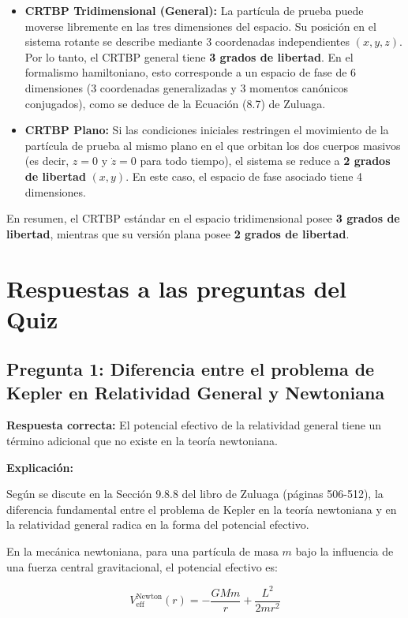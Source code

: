 \documentclass[a4paper]{article}
\begin{document}
\begin{itemize}
    \item \textbf{CRTBP Tridimensional (General):} La partícula de prueba puede moverse libremente en las tres dimensiones del espacio. Su posición en el sistema rotante se describe mediante 3 coordenadas independientes $(x, y, z)$. Por lo tanto, el CRTBP general tiene \textbf{3 grados de libertad}. En el formalismo hamiltoniano, esto corresponde a un espacio de fase de 6 dimensiones (3 coordenadas generalizadas y 3 momentos canónicos conjugados), como se deduce de la Ecuación (8.7) de Zuluaga.
    
    \item \textbf{CRTBP Plano:} Si las condiciones iniciales restringen el movimiento de la partícula de prueba al mismo plano en el que orbitan los dos cuerpos masivos (es decir, $z = 0$ y $\dot{z} = 0$ para todo tiempo), el sistema se reduce a \textbf{2 grados de libertad} $(x, y)$. En este caso, el espacio de fase asociado tiene 4 dimensiones.
\end{itemize}

En resumen, el CRTBP estándar en el espacio tridimensional posee \textbf{3 grados de libertad}, mientras que su versión plana posee \textbf{2 grados de libertad}.

\section*{Respuestas a las preguntas del Quiz}

\subsection*{Pregunta 1: Diferencia entre el problema de Kepler en Relatividad General y Newtoniana}

\textbf{Respuesta correcta:} El potencial efectivo de la relatividad general tiene un término adicional que no existe en la teoría newtoniana.

\textbf{Explicación:}

Según se discute en la Sección 9.8.8 del libro de Zuluaga (páginas 506-512), la diferencia fundamental entre el problema de Kepler en la teoría newtoniana y en la relatividad general radica en la forma del potencial efectivo. 

En la mecánica newtoniana, para una partícula de masa $m$ bajo la influencia de una fuerza central gravitacional, el potencial efectivo es:

$$V_{\text{eff}}^{\text{Newton}}(r) = -\frac{GMm}{r} + \frac{L^2}{2mr^2}$$
\end{document}
